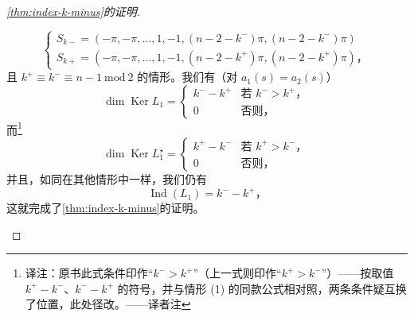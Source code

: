 \begin{proof}[\cref{thm:index-k-minus}的证明]
\begin{enumerate}[label=(\arabic*)]
\[
\left\{\begin{array}{l}
S_{k-}=(-\pi,-\pi,\dotsc,1,-1,(n-2-k^{-})\pi,(n-2-k^{-})\pi)\\
S_{k+}=(-\pi,-\pi,\dotsc,1,-1,(n-2-k^{+})\pi,(n-2-k^{+})\pi)\text{，}
\end{array}\right.
\]
且 $k^{+}\equiv k^{-}\equiv n-1\ \mathrm{mod}\ 2$ 的情形。我们有（对 $a_1(s)=a_2(s)$）
\[
\dim\operatorname{Ker}L_1=\left\{\begin{array}{ll}
k^{-}-k^{+} & \text{若 }k^{-}>k^{+}\text{，}\\
0 & \text{否则，}
\end{array}\right.
\]
而\footnote{译注：原书此式条件印作“$k^{-}>k^{+}$”（上一式则印作“$k^{+}>k^{-}$”）——按取值 $k^{+}-k^{-}$、$k^{-}-k^{+}$ 的符号，并与情形 (1) 的同款公式相对照，两条条件疑互换了位置，此处径改。——译者注}
\[
\dim\operatorname{Ker}L_1^{\star}=\left\{\begin{array}{ll}
k^{+}-k^{-} & \text{若 }k^{+}>k^{-}\text{，}\\
0 & \text{否则，}
\end{array}\right.
\]
并且，如同在其他情形中一样，我们仍有
\[
\operatorname{Ind}(L_1)=k^{-}-k^{+}\text{，}
\]
这就完成了\cref{thm:index-k-minus}的证明。
\end{enumerate}
\end{proof}


